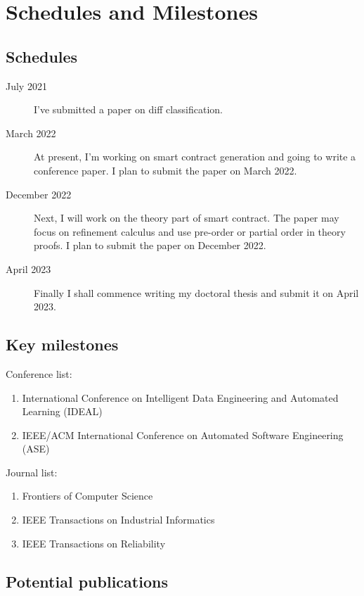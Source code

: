 \chapter{Schedules and Milestones}

\section{Schedules}


\begin{description}
   \item[July 2021]  I've submitted a paper on diff classification.
   \item[March 2022] At present, I'm working on smart contract generation and going to write a conference paper. I plan to submit the paper on March 2022.
   \item[December 2022]  Next, I will work on the theory part of smart contract. The paper may focus on refinement calculus and use pre-order or partial order in theory proofs. I plan to submit the paper on December 2022.
   \item[April 2023] Finally I shall commence writing my doctoral thesis and submit it on April 2023.
\end{description}


\section{Key milestones}

Conference list:
\begin{enumerate}
\item International Conference on Intelligent Data Engineering and Automated Learning (IDEAL)
\item IEEE/ACM International Conference on Automated Software Engineering (ASE)
\end{enumerate}

Journal list:
\begin{enumerate}
\item Frontiers of Computer Science
\item IEEE Transactions on Industrial Informatics
\item IEEE Transactions on Reliability
\end{enumerate}

\section{Potential publications}

